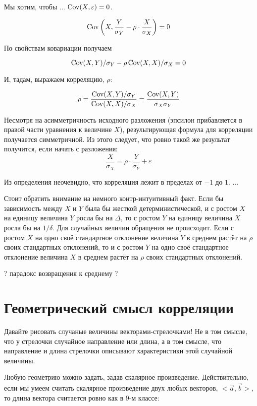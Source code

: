 \documentclass[10pt]{article}
\begin{document}
%

Мы хотим, чтобы ... $\operatorname{Cov}(X,\varepsilon)=0$. 


\[
\operatorname{Cov}\left(X, \frac{Y}{\sigma_Y} - \rho \cdot \frac{X}{\sigma_X} \right) = 0
\]

По свойствам ковариации получаем

\[
\operatorname{Cov}(X,Y)/\sigma_Y- \rho \operatorname{Cov}(X,X)/\sigma_X=0
\]

И, тадам, выражаем корреляцию, $\rho$:

\[
\rho = \frac{\operatorname{Cov}(X,Y)/\sigma_Y}{\operatorname{Cov}(X,X)/\sigma_X} = \frac{\operatorname{Cov}(X,Y)}{\sigma_X \sigma_Y}
\]

Несмотря на асимметричность исходного разложения (эпсилон прибавляется в правой части уравнения к величине $X$), результирующая формула для корреляции получается симметричной. Из этого следует, что ровно такой же результат получится, если начать с разложения:
\[
\frac{X}{\sigma_X}=\rho \cdot \frac{Y}{\sigma_Y} + \varepsilon
\]

Из определения неочевидно, что корреляция лежит в пределах от $-1$ до $1$. ...


Стоит обратить внимание на немного контр-интуитивный факт. Если бы зависимость между $X$ и $Y$ была бы жесткой детерминистической, и с ростом $X$ на единицу величина $Y$ росла бы на $\Delta$, то с ростом $Y$ на единицу величина $X$ росла бы на $1/\delta$. Для случайных величин обращения не происходит. Если с ростом $X$ на одно своё стандартное отклонение величина $Y$ в среднем растёт на $\rho$ своих стандартных отклонений, то и с ростом $Y$ на одно своё стандартное отклонение величина $X$ в среднем растёт на $\rho$ своих стандартных отклонений.



? парадокс возвращения к среднему ?


\section{Геометрический смысл корреляции}

Давайте рисовать случаные величины векторами-стрелочками! Не в том смысле, что у стрелочки случайное направление или длина, а в том смысле, что направление и длина стрелочки описывают характеристики этой случайной величины. 

Любую геометрию можно задать, задав скалярное произведение. Действительно, если мы умеем считать скалярное произведение двух любых векторов, $<\vec{a},\vec{b}>$, то длина вектора считается ровно как в 9-м классе:
\end{document}
